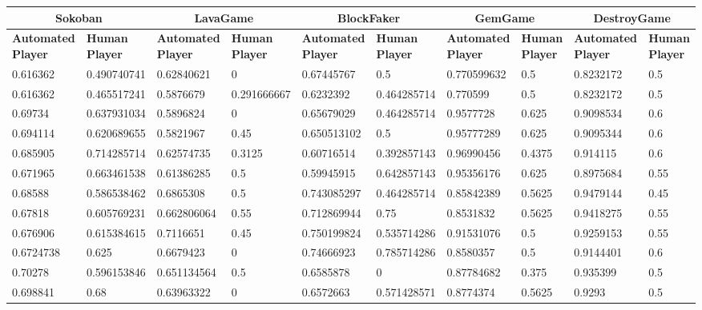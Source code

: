 \begin{landscape}
\begin{table}[!ht]
	\centering
	\begin{tabular}{|p{0.8in}|p{0.8in}|p{0.8in}|p{0.8in}|p{0.8in}|p{0.8in}|p{0.8in}|p{0.8in}|p{0.8in}|p{0.8in}|}
		\hline
		\multicolumn{2}{c}{\textbf{Sokoban}} & \multicolumn{2}{c}{\textbf{LavaGame}} & \multicolumn{2}{c}{\textbf{\textbf{BlockFaker}}} & \multicolumn{2}{c}{\textbf{GemGame}} & \multicolumn{2}{c}{\textbf{DestroyGame}}\\
		\hline
		\textbf{Automated Player} & \textbf{Human Player} & \textbf{Automated Player} & \textbf{Human Player} & \textbf{Automated Player} & \textbf{Human Player} & \textbf{Automated Player} & \textbf{Human Player} & \textbf{Automated Player} & \textbf{Human Player}\\
		\hline
		0.616362 & 0.490740741 & 0.62840621 & 0 & 0.67445767 & 0.5 & 0.770599632 & 0.5 & 0.8232172 & 0.5\\
		\hline
		0.616362 & 0.465517241 & 0.5876679 & 0.291666667 & 0.6232392 & 0.464285714 & 0.770599 & 0.5 & 0.8232172 & 0.5\\
		\hline
		0.69734 & 0.637931034 & 0.5896824 & 0 & 0.65679029 & 0.464285714 & 0.9577728 & 0.625 & 0.9098534 & 0.6\\
		\hline
		0.694114 & 0.620689655 & 0.5821967 & 0.45 & 0.650513102 & 0.5 & 0.95777289 & 0.625 & 0.9095344 & 0.6\\
		\hline
		0.685905 & 0.714285714 & 0.62574735 & 0.3125 & 0.60716514 & 0.392857143 & 0.96990456 & 0.4375 & 0.914115 & 0.6\\
		\hline
		0.671965 & 0.663461538 & 0.61386285 & 0.5 & 0.59945915 & 0.642857143 & 0.95356176 & 0.625 & 0.8975684 & 0.55\\
		\hline
		0.68588 & 0.586538462 & 0.6865308 & 0.5 & 0.743085297 & 0.464285714 & 0.85842389 & 0.5625 & 0.9479144 & 0.45\\
		\hline
		0.67818 & 0.605769231 & 0.662806064 & 0.55 & 0.712869944 & 0.75 & 0.8531832 & 0.5625 & 0.9418275 & 0.55\\
		\hline
		0.676906 & 0.615384615 & 0.7116651 & 0.45 & 0.750199824 & 0.535714286 & 0.91531076 & 0.5 & 0.9259153 & 0.55\\
		\hline
		0.6724738 & 0.625 & 0.6679423 & 0 & 0.74666923 & 0.785714286 & 0.8580357 & 0.5 & 0.9144401 & 0.6\\
		\hline
		0.70278 & 0.596153846 & 0.651134564 & 0.5 & 0.6585878 & 0 & 0.87784682 & 0.375 & 0.935399 & 0.5\\
		\hline
		0.698841 & 0.68 & 0.63963322 & 0 & 0.6572663 & 0.571428571 & 0.8774374 & 0.5625 & 0.9293 & 0.5\\

\end{tabular}
\end{table}
\end{landscape}
